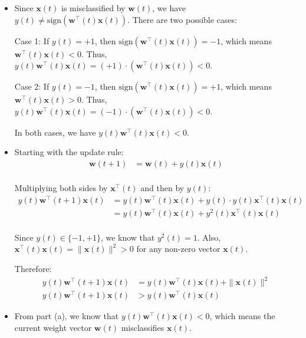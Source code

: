 \begin{itemize}
\item[(a)] Since $\mathbf{x}(t)$ is misclassified by $\mathbf{w}(t)$, we have $y(t) \neq \text{sign}(\mathbf{w}^\top(t) \mathbf{x}(t))$. There are two possible cases:

Case 1: If $y(t) = +1$, then $\text{sign}(\mathbf{w}^\top(t) \mathbf{x}(t)) = -1$, which means $\mathbf{w}^\top(t) \mathbf{x}(t) < 0$. Thus, $y(t) \mathbf{w}^\top(t) \mathbf{x}(t) = (+1) \cdot (\mathbf{w}^\top(t) \mathbf{x}(t)) < 0$.

Case 2: If $y(t) = -1$, then $\text{sign}(\mathbf{w}^\top(t) \mathbf{x}(t)) = +1$, which means $\mathbf{w}^\top(t) \mathbf{x}(t) > 0$. Thus, $y(t) \mathbf{w}^\top(t) \mathbf{x}(t) = (-1) \cdot (\mathbf{w}^\top(t) \mathbf{x}(t)) < 0$.

In both cases, we have $y(t) \mathbf{w}^\top(t) \mathbf{x}(t) < 0$.

\item[(b)] Starting with the update rule:
\begin{align*}
\mathbf{w}(t+1) &= \mathbf{w}(t) + y(t)\mathbf{x}(t)\\
\end{align*}

Multiplying both sides by $\mathbf{x}^\top(t)$ and then by $y(t)$:
\begin{align*}
y(t)\mathbf{w}^\top(t+1)\mathbf{x}(t) &= y(t)\mathbf{w}^\top(t)\mathbf{x}(t) + y(t)\cdot y(t)\mathbf{x}^\top(t)\mathbf{x}(t)\\
&= y(t)\mathbf{w}^\top(t)\mathbf{x}(t) + y^2(t)\mathbf{x}^\top(t)\mathbf{x}(t)\\
\end{align*}

Since $y(t) \in \{-1, +1\}$, we know that $y^2(t) = 1$. Also, $\mathbf{x}^\top(t)\mathbf{x}(t) = \|\mathbf{x}(t)\|^2 > 0$ for any non-zero vector $\mathbf{x}(t)$.

Therefore:
\begin{align*}
y(t)\mathbf{w}^\top(t+1)\mathbf{x}(t) &= y(t)\mathbf{w}^\top(t)\mathbf{x}(t) + \|\mathbf{x}(t)\|^2\\
y(t)\mathbf{w}^\top(t+1)\mathbf{x}(t) &> y(t)\mathbf{w}^\top(t)\mathbf{x}(t)
\end{align*}

\item[(c)] From part (a), we know that $y(t) \mathbf{w}^\top(t) \mathbf{x}(t) < 0$, which means the current weight vector $\mathbf{w}(t)$ misclassifies $\mathbf{x}(t)$.


\end{itemize}
